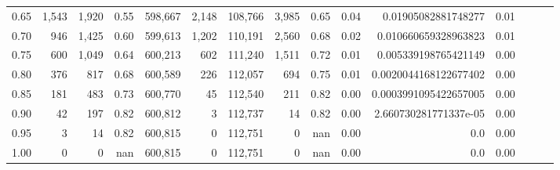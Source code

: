 \begin{tabular}{rrrrrrrrrrrrrrr}
0.65 &    1,543 &   1,920 &  0.55 &  598,667 &    2,148 &  108,766 &    3,985 &  0.65 &  0.04 &    0.01905082881748277 &      0.01 \\
0.70 &      946 &   1,425 &  0.60 &  599,613 &    1,202 &  110,191 &    2,560 &  0.68 &  0.02 &   0.010660659328963823 &      0.01 \\
0.75 &      600 &   1,049 &  0.64 &  600,213 &      602 &  111,240 &    1,511 &  0.72 &  0.01 &   0.005339198765421149 &      0.00 \\
0.80 &      376 &     817 &  0.68 &  600,589 &      226 &  112,057 &      694 &  0.75 &  0.01 &  0.0020044168122677402 &      0.00 \\
0.85 &      181 &     483 &  0.73 &  600,770 &       45 &  112,540 &      211 &  0.82 &  0.00 &  0.0003991095422657005 &      0.00 \\
0.90 &       42 &     197 &  0.82 &  600,812 &        3 &  112,737 &       14 &  0.82 &  0.00 &  2.660730281771337e-05 &      0.00 \\
0.95 &        3 &      14 &  0.82 &  600,815 &        0 &  112,751 &        0 &   nan &  0.00 &                    0.0 &      0.00 \\
1.00 &        0 &       0 &   nan &  600,815 &        0 &  112,751 &        0 &   nan &  0.00 &                    0.0 &      0.00 \\
\bottomrule
\end{tabular}
